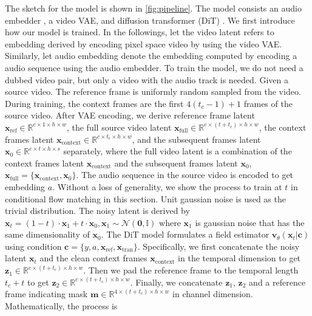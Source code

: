The sketch for the model is shown in \cref{fig:pipeline}. The model consists an audio embedder \cite{wav2vec}, a video VAE, and diffusion transformer (DiT) \cite{dit}. We first introduce how our model is trained. In the followings, let the video latent refers to embedding derived by encoding pixel space video by using the video VAE. Similarly, let audio embedding denote the embedding computed by encoding a audio sequence using the audio embedder. To train the model, we do not need a dubbed video pair, but only a video with the audio track is needed. Given a source video. The reference frame is uniformly random sampled from the video. During training, the context frames are the first $4(t_c - 1) + 1$ frames of the source video. After VAE encoding, we derive reference frame latent $\boldsymbol{x}_{\mathrm{ref}} \in \mathbb{R}^{c \times 1 \times h \times w}$, the full source video latent $\boldsymbol{x}_{\mathrm{full}} \in \mathbb{R}^{c \times (t + t_c) \times h \times w}$, the context frames latent $\boldsymbol{x}_{\mathrm{context}} \in \mathbb{R}^{c \times t_c \times h \times w}$, and the subsequent frames latent $\boldsymbol{x}_0 \in \mathbb{R}^{c \times t \times h \times s}$ separately, where the full video latent is a combination of the context frames latent  $\boldsymbol{x}_{\mathrm{context}}$ and the subsequent frames latent $\boldsymbol{x}_0$, $\boldsymbol{x}_{\mathrm{full}} = \{\boldsymbol{x}_{\mathrm{context}}, \boldsymbol{x}_0\}$. The audio sequence in the source video is encoded to get embedding $a$. Without a loss of generality, we show the process to train at $t$ in conditional flow matching in this section. Unit gaussian noise is used as the trivial distribution. The noisy latent is derived by $\boldsymbol{x}_t = (1 - t) \cdot \boldsymbol{x}_1 + t \cdot \boldsymbol{x}_0, \boldsymbol{x}_1 \sim \mathcal{N}(\boldsymbol{0}, \mathbb{I})$ where $\boldsymbol{x}_1$ is gaussian noise that has the same dimensionality of $\boldsymbol{x}_0$. The DiT model formulates a field estimator $\boldsymbol{v}_\theta(\boldsymbol{x}_t \vert \boldsymbol{c})$ using condition $\boldsymbol{c} = \{y, a, \boldsymbol{x}_{\mathrm{ref}}, \boldsymbol{x}_{\mathrm{tran}}\}$. Specifically, we first concatenate the noisy latent $\boldsymbol{x}_t$ and the clean context frames $\boldsymbol{x}_{\mathrm{context}}$ in the temporal dimension to get $\boldsymbol{z}_1 \in \mathbb{R}^{c \times (t + t_c) \times h \times w}$. Then we pad the reference frame to the temporal length $t_c + t$ to get $\boldsymbol{z}_2 \in \mathbb{R}^{c \times (t + t_c) \times h \times w}$. Finally, we concatenate $\boldsymbol{z}_1$, $\boldsymbol{z}_2$ and a reference frame indicating mask $\boldsymbol{m} \in \mathbb{R}^{4 \times (t + t_c) \times h \times w}$ in channel dimension. Mathematically, the process is

